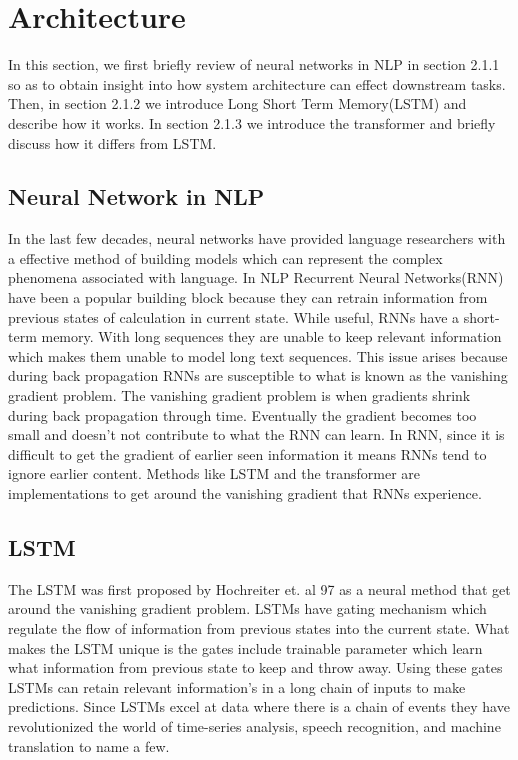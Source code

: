 \section{Architecture}
In this section, we first briefly review of neural networks in NLP in section 2.1.1 so as to obtain insight into how system architecture can effect downstream tasks. Then, in section 2.1.2 we introduce Long Short Term Memory(LSTM) \cite{} and describe how it works. In section 2.1.3 we introduce the transformer \cite{} and briefly discuss how it differs from LSTM. 
\subsection{Neural Network in NLP}
In the last few decades, neural networks have provided language researchers with a effective method of building models which can represent the complex phenomena associated with language. In NLP Recurrent Neural Networks(RNN) have been a popular building block because they can retrain information from previous states of calculation in current state. While useful, RNNs have a short-term memory. With long sequences they are unable to keep relevant information which makes them unable to model long text sequences. This issue arises because during back propagation RNNs are susceptible to what is known as the vanishing gradient problem. The vanishing gradient problem is when gradients shrink during back propagation through time. Eventually the gradient becomes too small and doesn't not contribute to what the RNN can learn. In RNN, since it is difficult to get the gradient of earlier seen information it means RNNs tend to ignore earlier content. Methods like LSTM and the transformer are implementations to get around the vanishing gradient that RNNs experience. 
\subsection{LSTM}
The LSTM was first proposed by Hochreiter et. al 97 \cite{Hochreiter1997LongSM} as a neural method that get around the vanishing gradient problem. LSTMs have gating mechanism which regulate the flow of information from previous states into the current state. What makes the LSTM unique is the gates include trainable parameter which learn what information from previous state to keep and throw away. Using these gates LSTMs can retain relevant information's in a long chain of inputs to make predictions. Since LSTMs excel at data where there is a chain of events they have revolutionized the world of time-series analysis, speech recognition, and machine translation to name a few. 
